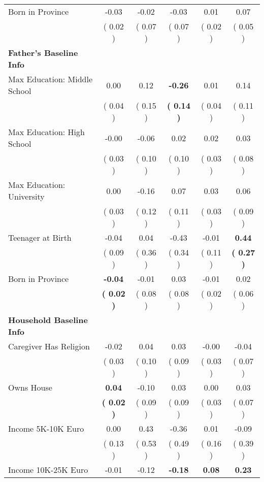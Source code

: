 \begin{table}[H]
{\begin{tabular}{lccccc}
\quad Born in Province &     -0.03 &     -0.02 &     -0.03 &      0.01 &      0.07 \\
\quad  & (     0.02 ) & (     0.07 )  & (     0.07 )  & (     0.02 ) & (     0.05 ) \\
\midrule
\textbf{Father's Baseline Info} \\
\quad Max Education: Middle School &      0.00 &      0.12 & \textbf{    -0.26} &      0.01 &      0.14 \\
\quad  & (     0.04 ) & (     0.15 )  & \textbf{(     0.14 )}  & (     0.04 ) & (     0.11 ) \\
\quad Max Education: High School &     -0.00 &     -0.06 &      0.02 &      0.02 &      0.03 \\
\quad  & (     0.03 ) & (     0.10 )  & (     0.10 )  & (     0.03 ) & (     0.08 ) \\
\quad Max Education: University &      0.00 &     -0.16 &      0.07 &      0.03 &      0.06 \\
\quad  & (     0.03 ) & (     0.12 )  & (     0.11 )  & (     0.03 ) & (     0.09 ) \\
\quad Teenager at Birth &     -0.04 &      0.04 &     -0.43 &     -0.01 & \textbf{     0.44} \\
\quad  & (     0.09 ) & (     0.36 )  & (     0.34 )  & (     0.11 ) & \textbf{(     0.27 )} \\
\quad Born in Province & \textbf{    -0.04} &     -0.01 &      0.03 &     -0.01 &      0.02 \\
\quad  & \textbf{(     0.02 )} & (     0.08 )  & (     0.08 )  & (     0.02 ) & (     0.06 ) \\
\midrule
\textbf{Household Baseline Info} \\
\quad Caregiver Has Religion &     -0.02 &      0.04 &      0.03 &     -0.00 &     -0.04 \\
\quad  & (     0.03 ) & (     0.10 )  & (     0.09 )  & (     0.03 ) & (     0.07 ) \\
\quad Owns House & \textbf{     0.04} &     -0.10 &      0.03 &      0.00 &      0.03 \\
\quad  & \textbf{(     0.02 )} & (     0.09 )  & (     0.09 )  & (     0.03 ) & (     0.07 ) \\
\quad Income 5K-10K Euro &      0.00 &      0.43 &     -0.36 &      0.01 &     -0.09 \\
\quad  & (     0.13 ) & (     0.53 )  & (     0.49 )  & (     0.16 ) & (     0.39 ) \\
\quad Income 10K-25K Euro &     -0.01 &     -0.12 & \textbf{    -0.18} & \textbf{     0.08} & \textbf{     0.23} \\

\end{tabular}}
\end{table}
